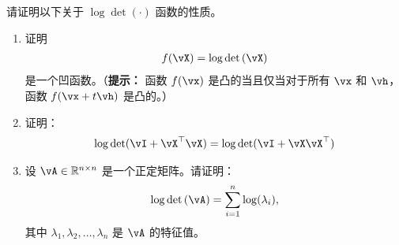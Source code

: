 \documentclass[../../book-main_zh.tex]{subfiles}
\begin{document}

\begin{exercise}
	请证明以下关于 $\log\det(\cdot)$ 函数的性质。
	\begin{enumerate}
		\item 证明
		      \begin{align*}
			      f(\vX) = \log\det\left(\vX\right)
		      \end{align*}
		      是一个凹函数。（{\bf 提示：} 函数 $f(\vx)$ 是凸的当且仅当对于所有 $\vx$ 和 $\vh$，函数 $f(\vx+t\vh)$ 是凸的。）

		\item 证明：
		      \begin{align*}
			      \log\det(\vI + \vX^\top\vX) = \log\det(\vI + \vX\vX^\top)
		      \end{align*}

		\item 设 $\vA \in \R^{n\times n}$ 是一个正定矩阵。请证明：
		      \begin{align}
			      \log\det\left(\vA \right) = \sum_{i=1}^n \log(\lambda_i),
		      \end{align}
		      其中 $\lambda_1,\lambda_2,\dots,\lambda_n$ 是 $\vA$ 的特征值。
	\end{enumerate}

\end{exercise}


 

 
\end{document}

